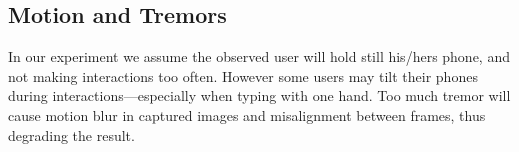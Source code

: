 \subsection{Motion and Tremors}
In our experiment we assume the observed user will hold still his/hers phone, and not making interactions too often. However some users may tilt their phones during interactions—especially when typing with one hand. Too much tremor will cause motion blur in captured images and misalignment between frames, thus degrading the result.




